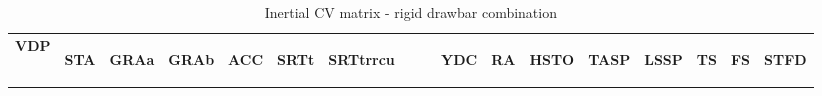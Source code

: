 

\begin{table}[H]
\centering\scriptsize
\caption{Inertial CV matrix - rigid drawbar combination}   
\label{table:cv-inertial-rigid-drawbar}%
\begin{tabular}{|l|c|c|c|c|c|c|c|c|c|c|c|c|c|c|}

\hline
\multicolumn{1}{|c|}{\textbf{VDP}} & \begin{sideways}\textbf{STA}\end{sideways} & \begin{sideways}\textbf{GRAa}\end{sideways} & \begin{sideways}\textbf{GRAb}\end{sideways} & \begin{sideways}\textbf{ACC}\end{sideways} & \begin{sideways}\textbf{SRTt}\end{sideways} & \begin{sideways}\textbf{SRTtrrcu~~~~}\end{sideways} & \begin{sideways}\textbf{YDC}\end{sideways} & \begin{sideways}\textbf{RA}\end{sideways} & \begin{sideways}\textbf{HSTO}\end{sideways} & \begin{sideways}\textbf{TASP}\end{sideways} & \begin{sideways}\textbf{LSSP}\end{sideways} & \begin{sideways}\textbf{TS}\end{sideways} & \begin{sideways}\textbf{FS}\end{sideways} & \begin{sideways}\textbf{STFD}\end{sideways} \bigstrut\\


\end{tabular}
\end{table}
